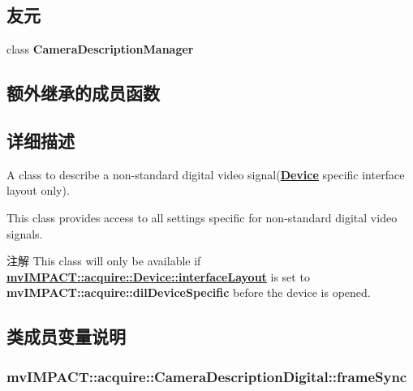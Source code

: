 \subsection*{友元}
\begin{DoxyCompactItemize}
\item 
\hypertarget{classmv_i_m_p_a_c_t_1_1acquire_1_1_camera_description_digital_a754f74db1fd8a2e7cf0bca76c10d00dd}{class {\bfseries Camera\+Description\+Manager}}\label{classmv_i_m_p_a_c_t_1_1acquire_1_1_camera_description_digital_a754f74db1fd8a2e7cf0bca76c10d00dd}

\end{DoxyCompactItemize}
\subsection*{额外继承的成员函数}


\subsection{详细描述}
A class to describe a non-\/standard digital video signal({\bfseries \hyperlink{classmv_i_m_p_a_c_t_1_1acquire_1_1_device}{Device}} specific interface layout only). 

This class provides access to all settings specific for non-\/standard digital video signals.

\begin{DoxyNote}{注解}
This class will only be available if {\bfseries \hyperlink{classmv_i_m_p_a_c_t_1_1acquire_1_1_device_ab4dd0ecc9d456bb5ddc01d844c9d6f2d}{mv\+I\+M\+P\+A\+C\+T\+::acquire\+::\+Device\+::interface\+Layout}} is set to {\bfseries mv\+I\+M\+P\+A\+C\+T\+::acquire\+::dil\+Device\+Specific} before the device is opened. 
\end{DoxyNote}


\subsection{类成员变量说明}
\hypertarget{classmv_i_m_p_a_c_t_1_1acquire_1_1_camera_description_digital_a645b292f957b6124ac83181de0afae0b}{
\subsubsection[{frame\+Sync}]{ mv\+I\+M\+P\+A\+C\+T\+::acquire\+::\+Camera\+Description\+Digital\+::frame\+Sync}}\label{classmv_i_m_p_a_c_t_1_1acquire_1_1_camera_description_digital_a645b292f957b6124ac83181de0afae0b}


